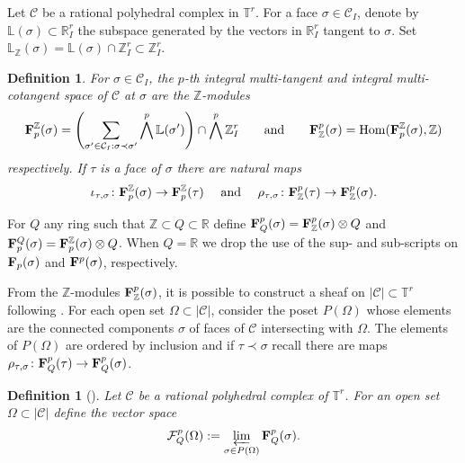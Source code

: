 \documentclass[11pt]{article}
\numberwithin{equation}{numsection}
\newcommand{\Z}{{\mathbb Z}}
\newcommand{\CC}{{\mathcal C}}
\newcommand{\R}{{\mathbb R}}
\newcommand{\TT}{{\mathbb T}}
\newcommand{\T}{{\mathbb T}}
\newcommand{\C}{{\mathcal C}}
\newcommand{\Linear}{\mathbb{L}}
\newcommand{\imap}{\iota_{\tau,\sigma}}
\newcommand{\rmap}{\rho_{\tau,\sigma}}
\DeclareMathOperator{\Hom}{Hom}
\newtheorem{defn}[thm]{Definition}
\begin{document}
Let  $\C$ be  a  rational polyhedral complex in $\TT^r$. 
For a face  $\sigma \in \C_I$,  denote by $\mathbb{L} (\sigma) \subset \R^r_I$
the subspace generated by the vectors in $\R^r_I$ tangent to $\sigma$.
Set $\mathbb{L}_{\Z} (\sigma) = \mathbb{L} (\sigma) \cap \Z^r_I \subset \Z^r_I$.


\begin{defn}\label{def:multitangent}
 For $\sigma \in \CC_I$,
the  $p$-th \emph{integral multi-tangent} and \emph{integral multi-cotangent space}
 of $\CC$ at $\sigma$ are the $\Z$-modules
$${\bf F}^{\Z}_p(\sigma) =  \left(\sum \limits_{ \sigma' \in \CC_I: \sigma \prec \sigma'} \bigwedge^p \Linear(\sigma')\right) \cap \bigwedge^p \Z^r_I 
\qquad \text{and} \qquad
{\bf F}_{\Z}^p(\sigma) = \Hom({\bf F}^{\Z}_p(\sigma),\Z)$$
respectively.  
If  $\tau$ is a face of $\sigma$ there are natural  maps 
\begin{align*}
\imap \colon {\bf F}^{\Z}_p(\sigma) \to {\bf F}^{\Z}_p(\tau) \quad \text{ and } 
\quad  \rmap \colon {\bf F}_{\Z}^p(\tau) \to {\bf F}_{\Z}^p(\sigma).
\end{align*}
\end{defn}


For $Q$ any ring such that $\Z \subset Q \subset \R$ define 
${\bf F}_Q^{p}(\sigma) ={ \bf F}_{\Z}^{p}(\sigma) \otimes Q$ and ${\bf F}^Q_{p}(\sigma) ={ \bf F}^{\Z}_{p}(\sigma) \otimes Q$.
When $Q = \R$ we drop the use of the sup- and  sub-scripts on ${\bf F}_p(\sigma)$ and ${\bf F}^p(\sigma)$, respectively.





From the  
$\Z$-modules ${\bf F}_{\Z}^p(\sigma)$,  it is possible to construct a sheaf on $|\CC| \subset \T^r$
following   \cite[Section 2.3]{MikZhar}. 
 For each open set $\Omega \subset |\CC|$, consider the  poset $P(\Omega)$ 
whose elements are the connected components $\sigma$ of faces of $\CC$ intersecting with $\Omega$. 
The elements of $P(\Omega)$  are ordered by inclusion and if $\tau \prec \sigma$ recall there are maps 
$\rmap  \colon {\bf{F}}_{Q}^p(\tau) \to {\bf{F}}_{Q}^p(\sigma)$.



 \begin{defn}[\cite{MikZhar}]\label{def:sheafconst}
Let $\C$ be a rational polyhedral complex of $\T^r$. For an open set $\Omega \subset |\CC|$ define the vector space
\begin{align*}
\mathcal{F}^p_{Q}(\Omega)  := \varprojlim_{\sigma \in P(\Omega)} {\bf F}_{Q}^p( \sigma).
\end{align*}
\end{defn}
\end{document}
